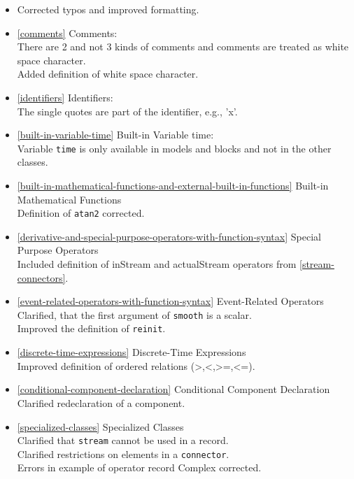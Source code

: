 \begin{itemize}
\item
  Corrected typos and improved formatting.
\item
  \autoref{comments} Comments:\\
  There are 2 and not 3 kinds of comments and comments are treated as
  white space character.\\
  Added definition of white space character.
\item
  \autoref{identifiers} Identifiers:\\
  The single quotes are part of the identifier, e.g., 'x'.
\item
  \autoref{built-in-variable-time} Built-in Variable time:\\
  Variable \lstinline!time! is only available in models and blocks and not in the
  other classes.
\item
  \autoref{built-in-mathematical-functions-and-external-built-in-functions} Built-in Mathematical Functions\\
  Definition of \lstinline!atan2! corrected.
\item
  \autoref{derivative-and-special-purpose-operators-with-function-syntax} Special Purpose Operators\\
  Included definition of inStream and actualStream operators from
  \autoref{stream-connectors}.
\item
  \autoref{event-related-operators-with-function-syntax} Event-Related Operators\\
  Clarified, that the first argument of \lstinline!smooth! is a scalar.\\
  Improved the definition of \lstinline!reinit!.
\item
  \autoref{discrete-time-expressions} Discrete-Time Expressions\\
  Improved definition of ordered relations
  (\textgreater{},\textless{},\textgreater{}=,\textless{}=).
\item
  \autoref{conditional-component-declaration} Conditional Component Declaration\\
  Clarified redeclaration of a component.
\item
  \autoref{specialized-classes} Specialized Classes\\
  Clarified that \lstinline!stream! cannot be used in a record.\\
  Clarified restrictions on elements in a \lstinline!connector!.\\
  Errors in example of operator record Complex corrected.

\end{itemize}
